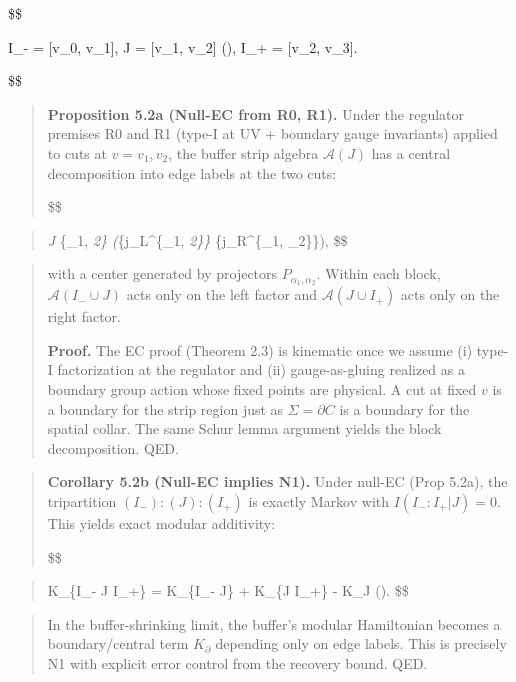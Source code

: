 \documentclass[11pt,a4paper]{article}
\theoremstyle{remark}
\begin{document}
\$\$

I\_- = {[}v\_0, v\_1{]}, \quad J = {[}v\_1, v\_2{]} \quad (), \quad
I\_+ = {[}v\_2, v\_3{]}.

\$\$

\begin{quote}
\textbf{Proposition 5.2a (Null-EC from R0, R1).} Under the regulator premises R0
and R1 (type-I at UV + boundary gauge invariants) applied to cuts at
\(v = v_1, v_2\), the buffer strip algebra \(\mathcal{A}(J)\) has a central
decomposition into edge labels at the two cuts:

\$\$
\end{quote}

\begin{quote}
\emph{J \cong \bigoplus}\{\alpha\_1, \alpha\emph{2\}
\left(}\{j\_L\^{}\{\alpha\_1, \alpha\emph{2\}\} \otimes
{}}\{j\_R\^{}\{\alpha\_1, \alpha\_2\}\}\right),
\$\$
\end{quote}

\begin{quote}
with a center generated by projectors \(P_{\alpha_1, \alpha_2}\). Within each
block, \(\mathcal{A}(I_- \cup J)\) acts only on the left factor and
\(\mathcal{A}(J \cup I_+)\) acts only on the right factor.

\textbf{Proof.} The EC proof (Theorem 2.3) is kinematic once we assume
(i) type-I factorization at the regulator and (ii) gauge-as-gluing realized
as a boundary group action whose fixed points are physical. A cut at fixed
\(v\) is a boundary for the strip region just as \(\Sigma = \partial C\) is a
boundary for the spatial collar. The same Schur lemma argument yields the
block decomposition. QED.
\end{quote}

\begin{quote}
\textbf{Corollary 5.2b (Null-EC implies N1).} Under null-EC (Prop 5.2a), the
tripartition \((I_-):(J):(I_+)\) is exactly Markov with \(I(I_-:I_+ | J) = 0\).
This yields exact modular additivity:

\$\$
\end{quote}

\begin{quote}
K\_\{I\_- \cup J \cup I\_+\} = K\_\{I\_- \cup J\} + K\_\{J \cup I\_+\} - K\_J
\quad ().
\$\$
\end{quote}

\begin{quote}
In the buffer-shrinking limit, the buffer's modular Hamiltonian becomes a
boundary/central term \(K_\partial\) depending only on edge labels. This is
precisely N1 with explicit error control from the recovery bound. QED.
\end{quote}
\end{document}
